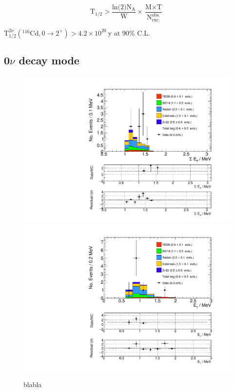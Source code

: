 \documentclass[main.tex]{subfiles}
\begin{document}
\begin{equation}
\text{T}_{\text{1/2}} > \frac{\text{ln(2)} \text{N}_\text{A}}{\text{W}} \times \frac{\text{M} \times \text{T}}{\text{N}_{\text{exc.}}^{\text{obs.}}}
\end{equation}


\begin{center}
$ \text{T}_{\text{1/2}}^{\text{2}\nu} (^{\text{116}} \text{Cd}, \text{0} \rightarrow \text{2}^{+}) > \text{4.2} \times \text{10}^{\text{20}}~\text{y}$ at 90\% C.L.
\end{center}


\FloatBarrier


\subsection{0$\nu$ decay mode}


\begin{figure} [h!]
\begin{center}
\includegraphics[scale=0.5]{pictures/FinalResults/bb0nu2/150/SEe_bb0nu2NS.pdf}
\includegraphics[scale=0.5]{pictures/FinalResults/bb0nu2/150/Eg_bb0nu2NS.pdf}
\end{center}
\caption{blabla}
\label{plot:SEeAndEg250bb0nu2}
\end{figure}
\end{document}

